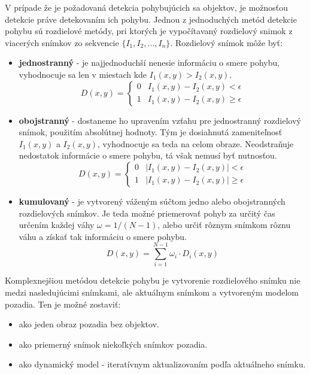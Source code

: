     V prípade že je požadovaná detekcia pohybujúcich sa objektov, je možnosťou detekcie práve detekovaním ich pohybu. Jednou z jednoduchých metód detekcie pohybu sú rozdielové metódy, pri ktorých je vypočítavaný rozdielový snimok z viacerých snímkov zo sekvencie \(\{I_1, I_2, ..., I_n\}\). Rozdielový snímok môže byť:

    \begin{itemize}
        \item \textbf{jednostranný} - je najjednoduchší nenesie informáciu o smere pohybu, vyhodnocuje sa len v miestach kde \(I_1(x,y) > I_2(x,y)\).
        \[D(x,y) = \begin{cases}
            0 & I_1(x,y) - I_2(x,y) < \epsilon \\
            1 & I_1(x,y) - I_2(x,y) \geq \epsilon
        \end{cases}\]

        \item \textbf{obojstranný} - dostaneme ho upravením vzťahu pre jednostranný rozdielový snímok, použitím absolútnej hodnoty. Tým je dosiahnutá zameniteľnosť \(I_1(x,y)\) a \(I_2(x,y)\), vyhodnocuje sa teda na celom obraze. Neodstraňuje nedostatok informácie o smere pohybu, tá však nemusí byť nutnosťou.
        \[D(x,y) = \begin{cases}
            0 & |I_1(x,y) - I_2(x,y)| < \epsilon \\
            1 & |I_1(x,y) - I_2(x,y)| \geq \epsilon
        \end{cases}\]

        \item \textbf{kumulovaný} - je vytvorený váženým súčtom jedno alebo obojstranných rozdielových snímkov. Je teda možné priemerovať pohyb za určitý čas určením každej váhy \(\omega = 1/(N-1)\), alebo určiť rôznym snímkom rôznu váhu a získať tak informáciu o smere pohybu.
        \[D(x,y) = \sum_{i=1}^{N-1}\omega_i \cdot D_i(x,y)\]
    \end{itemize}

    Komplexnejšiou metódou detekcie pohybu je vytvorenie rozdielového snímku nie medzi nasledujúcimi snímkami, ale aktuálnym snímkom a vytvoreným modelom pozadia. Ten je možné zostaviť:

    \begin{itemize}
        \item ako jeden obraz pozadia bez objektov.
        \item ako priemerný snímok niekoľkých snímkov pozadia.
        \item ako dynamický model - iteratívnym aktualizovaním podľa aktuálneho snímku.
    \end{itemize}


